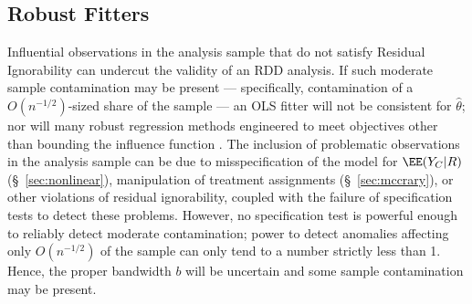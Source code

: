 


\subsection{Robust Fitters}\label{sec:robustFitters}
Influential observations in the analysis sample that do not satisfy Residual
Ignorability %
 can undercut the validity of an RDD analysis. 
If such moderate sample contamination may be present --- specifically, contamination of
a $O(n^{-1/2})$-sized
share of the sample --- an OLS fitter will not be consistent for $\hat{\theta}$;
nor will many robust regression methods engineered to meet
objectives other than bounding the influence function
\citep{stefanski1991note}.
The inclusion of problematic observations in the analysis sample can
be due to misspecification of the model for $\EE (Y_{C}|R)$
(\S~\ref{sec:nonlinear}), manipulation of treatment assignments
(\S~\ref{sec:mccrary}), or other violations of residual ignorability,
coupled with the failure of specification tests to detect these problems.
However, no specification test is powerful enough
to reliably detect moderate contamination; power to detect anomalies
affecting only $O(n^{-1/2})$ of the sample can only tend to a number
strictly less than 1.
Hence, the
proper bandwidth $b$ will be uncertain
and some sample contamination may be present.

